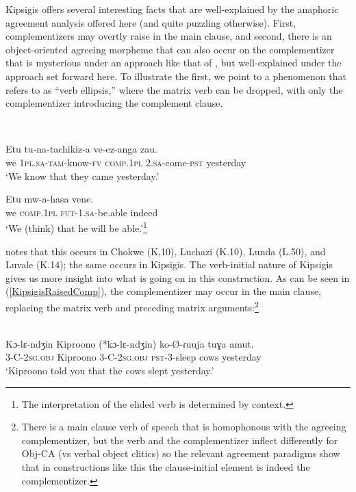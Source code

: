 Kipsigis offers several interesting facts that are well-explained by the anaphoric agreement analysis offered here (and quite puzzling otherwise). First, complementizers may overtly raise in the main clause, and second, there is an object-oriented agreeing morpheme that can also occur on the complementizer that is mysterious under an approach like that of \citet{Diercks:2013}, but well-explained under the approach set forward here. To illustrate the first, we point to a phenomenon that \citet{Kawasha:2007} refers to as ``verb ellipsis,'' where the matrix verb can be dropped, with only the complementizer introducing the complement clause. 

\ea
{}\\
\begin{xlist}

\ex 
\gll Etu tu-na-tachikiz-a  ve-ez-anga zau. \\
we 1\textsc{pl}.\textsc{sa}-\textsc{tam}-know-\textsc{fv} \textsc{comp}.1\textsc{pl} 2.\textsc{sa}-come-\textsc{pst} yesterday \\
\glt `We know that they came yesterday.'

\ex 
\gll Etu  mw-a-hasa vene. \\  
we \textsc{comp}.1\textsc{pl} \textsc{fut}-1.\textsc{sa}-be.able indeed\\
\glt `We (think) that he will be able.'\footnote{The interpretation of the elided verb is determined by context.}

\end{xlist}
\z 

\noindent \citet{Kawasha:2007} notes that this occurs in Chokwe (K,10), Luchazi (K.10), Lunda (L.50), and Luvale (K.14); the same occurs in Kipsigis. The verb-initial nature of Kipsigis gives us more insight into what is going on in this construction. As can be seen in (\ref{KipsigisRaisedComp}), the complementizer may occur in the main clause, replacing the matrix verb and preceding matrix arguments:\footnote{There is a main clause verb of speech that is homophonous with the agreeing complementizer, but the verb and the complementizer inflect differently for Obj-CA (vs verbal object clitics) so the relevant agreement paradigms show that in constructions like this the clause-initial element is indeed the complementizer.} 

\ea \label{KipsigisRaisedComp}
\\
\gll Kɔ-lɛ-ndʒin Kiproono (*kɔ-lɛ-ndʒin) ko-\O-ɾuuja tuɣa amut. \\
3-C-2\textsc{sg}.\textsc{obj} Kiproono 3-C-2\textsc{sg}.\textsc{obj} \textsc{pst}-3-sleep cows yesterday \\
\glt `Kiproono told you that the cows slept yesterday.'
\z

